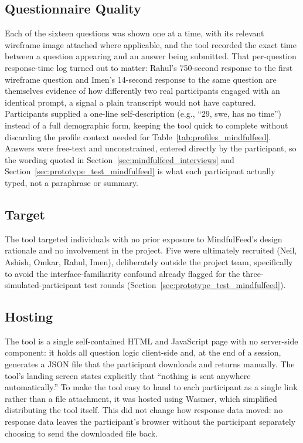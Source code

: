 \documentclass[11pt]{article}
\begin{document}
\subsection{Questionnaire Quality}
Each of the sixteen questions was shown one at a time, with its relevant wireframe image attached where applicable, and the tool recorded the exact time between a question appearing and an answer being submitted. That per-question response-time log turned out to matter: Rahul's 750-second response to the first wireframe question and Imen's 14-second response to the same question are themselves evidence of how differently two real participants engaged with an identical prompt, a signal a plain transcript would not have captured. Participants supplied a one-line self-description (e.g., ``29, swe, has no time'') instead of a full demographic form, keeping the tool quick to complete without discarding the profile context needed for Table~\ref{tab:profiles_mindfulfeed}. Answers were free-text and unconstrained, entered directly by the participant, so the wording quoted in Section~\ref{sec:mindfulfeed_interviews} and Section~\ref{sec:prototype_test_mindfulfeed} is what each participant actually typed, not a paraphrase or summary.

\subsection{Target}
The tool targeted individuals with no prior exposure to MindfulFeed's design rationale and no involvement in the project. Five were ultimately recruited (Neil, Ashish, Omkar, Rahul, Imen), deliberately outside the project team, specifically to avoid the interface-familiarity confound already flagged for the three-simulated-participant test rounds (Section~\ref{sec:prototype_test_mindfulfeed}).

\subsection{Hosting}
The tool is a single self-contained HTML and JavaScript page with no server-side component: it holds all question logic client-side and, at the end of a session, generates a JSON file that the participant downloads and returns manually. The tool's landing screen states explicitly that ``nothing is sent anywhere automatically.'' To make the tool easy to hand to each participant as a single link rather than a file attachment, it was hosted using Wasmer, which simplified distributing the tool itself. This did not change how response data moved: no response data leaves the participant's browser without the participant separately choosing to send the downloaded file back.
\end{document}
